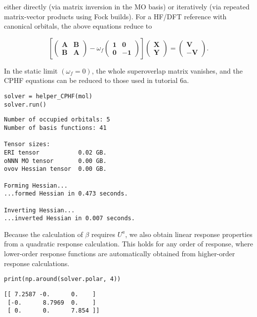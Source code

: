 \documentclass[]{article}
\begin{document}
either directly (via matrix inversion in the MO basis) or iteratively
(via repeated matrix-vector products using Fock builds). For a HF/DFT
reference with canonical orbitals, the above equations reduce to

\[
\left[
\begin{pmatrix}
\mathbf{A} & \mathbf{B} \\
\mathbf{B} & \mathbf{A}
\end{pmatrix}
- \omega_{f}
\begin{pmatrix}
\mathbf{1} & \mathbf{0} \\
\mathbf{0} & -\mathbf{1}
\end{pmatrix}
\right]
\begin{pmatrix}
\mathbf{X} \\
\mathbf{Y}
\end{pmatrix}
=
\begin{pmatrix}
\mathbf{V} \\
-\mathbf{V}
\end{pmatrix}
.
\]

In the static limit \((\omega_f = 0)\), the whole superoverlap matrix
vanishes, and the CPHF equations can be reduced to those used in
tutorial 6a.

\begin{verbatim}
solver = helper_CPHF(mol)
solver.run()
\end{verbatim}

\begin{verbatim}
Number of occupied orbitals: 5
Number of basis functions: 41

Tensor sizes:
ERI tensor           0.02 GB.
oNNN MO tensor       0.00 GB.
ovov Hessian tensor  0.00 GB.

Forming Hessian...
...formed Hessian in 0.473 seconds.

Inverting Hessian...
...inverted Hessian in 0.007 seconds.
\end{verbatim}

Because the calculation of \(\beta\) requires \(U^{a}\), we also obtain
linear response properties from a quadratic response calculation. This
holds for any order of response, where lower-order response functions
are automatically obtained from higher-order response calculations.

\begin{verbatim}
print(np.around(solver.polar, 4))
\end{verbatim}

\begin{verbatim}
[[ 7.2587 -0.      0.    ]
 [-0.      8.7969  0.    ]
 [ 0.      0.      7.854 ]]
\end{verbatim}
\end{document}
